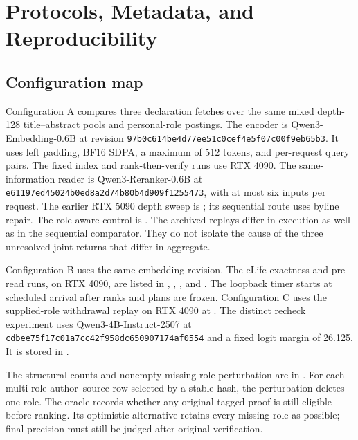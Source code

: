 \section{Protocols, Metadata, and Reproducibility}


\subsection{Configuration map}
Configuration A compares three declaration fetches over the same mixed depth-128 title--abstract pools and personal-role postings. The encoder is Qwen3-Embedding-0.6B at revision \texttt{97b0c614be4d77ee51c0cef4e5f07c00f9eb65b3}. It uses left padding, BF16 SDPA, a maximum of 512 tokens, and per-request query pairs. The fixed index and rank-then-verify runs use RTX 4090. The same-information reader is Qwen3-Reranker-0.6B at \texttt{e61197ed45024b0ed8a2d74b80b4d909f1255473}, with at most six inputs per request. The earlier RTX 5090 depth sweep is ; its sequential route uses byline repair. The role-aware control is . The archived replays differ in execution as well as in the sequential comparator. They do not isolate the cause of the three unresolved joint returns that differ in aggregate.

Configuration B uses the same embedding revision. The eLife exactness and pre-read runs, on RTX 4090, are listed in , , , and . The loopback timer starts at scheduled arrival after ranks and plans are frozen. Configuration C uses the supplied-role withdrawal replay on RTX 4090 at . The distinct recheck experiment uses Qwen3-4B-Instruct-2507 at \texttt{cdbee75f17c01a7cc42f958dc650907174af0554} and a fixed logit margin of 26.125. It is stored in .

The structural counts and nonempty missing-role perturbation are in . For each multi-role author--source row selected by a stable hash, the perturbation deletes one role. The oracle records whether any original tagged proof is still eligible before ranking. Its optimistic alternative retains every missing role as possible; final precision must still be judged after original verification.

